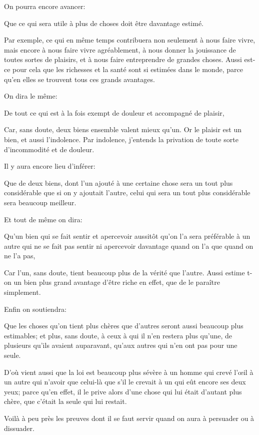 \bigbreak

On pourra encore avancer:

\begin{emphpar}
   Que ce qui sera utile à plus de choses doit être davantage estimé.
\end{emphpar}

Par exemple, ce qui en même temps contribuera non seulement à nous faire vivre, mais encore à nous faire vivre agréablement,
à nous donner la jouissance de toutes sortes de plaisirs, et à  nous faire entreprendre de grandes choses. Aussi est-ce pour
cela que les richesses et la santé sont si estimées dans le monde, parce qu'en elles se trouvent tous ces grands avantages.

\bigbreak

On dira le même:

\begin{emphpar}
   De tout ce qui est à la fois exempt de douleur et accompagné de plaisir,
\end{emphpar}

Car, sans doute, deux biens ensemble valent mieux qu'un. Or le plaisir est un bien, et aussi l'indolence. Par indolence,
j'entends la privation de toute sorte d'incommodité et de douleur.

\bigbreak

Il y aura encore lieu d'inférer:

\begin{emphpar}
   Que de deux biens, dont l'un ajouté à une certaine chose sera un tout plus considérable que si on y ajoutait l'autre,
   celui qui sera un tout plus considérable sera beaucoup meilleur.
\end{emphpar}

Et tout de même on dira:

\begin{emphpar}
   Qu'un bien qui se fait sentir et apercevoir aussitôt qu'on l'a sera préférable à un autre qui ne se fait pas sentir ni
   apercevoir davantage quand on l'a que quand on ne l'a pas,
\end{emphpar}

Car l'un, sans doute, tient beaucoup plus de la vérité que l'autre. Aussi estime t-on un bien plus grand avantage d'être
riche en effet, que de le paraître simplement.

\bigbreak

Enfin on soutiendra:

\begin{emphpar}
   Que les choses qu'on tient plus chères que d'autres seront aussi beaucoup plus estimables; et plus, sans doute, à ceux à
   qui il n'en restera plus qu'une, de plusieurs qu'ils avaient auparavant, qu'aux autres qui n'en ont pas pour une seule.
\end{emphpar}

D'où vient aussi que la loi est beaucoup plus sévère à un homme qui crevé l'œil à un autre qui n'avoir que celui-là que s'il
le crevait à un qui eût encore ses deux yeux; parce qu'en effet, il le prive alors d'une chose qui lui était d'autant plus chère,
que c'était la seule qui lui restait.

\bigbreak

Voilà à peu près les preuves dont il se faut servir quand on aura à persuader ou à dissuader.
